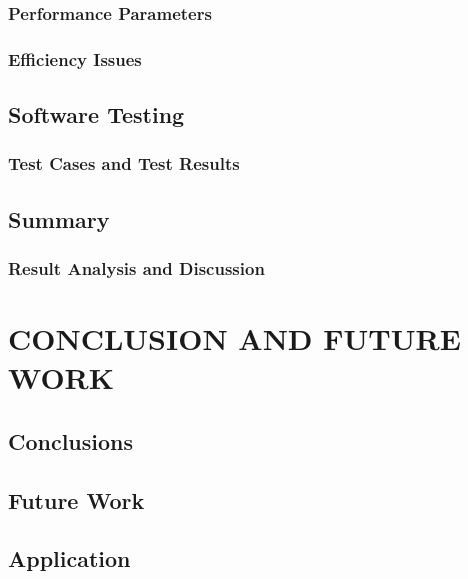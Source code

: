 \documentclass[12pt,a4]{report}
\makeatletter
\def\@makechapterhead#1{%
  \vspace*{\fill}%
  \begin{center}
    {\Huge\bfseries CHAPTER \thechapter\\[1.5ex]#1}
  \end{center}
  \thispagestyle{chaptertitle}%
  \vspace*{\fill}
  \clearpage
}
\makeatother
\begin{document}
\subsection{Performance Parameters}

\subsection{Efficiency Issues}

 \section{Software Testing}
  \subsection{Test Cases and Test Results}
 
 \section{Summary}
 \subsection{Result Analysis and Discussion}
 

 
 \chapter{CONCLUSION AND \vspace*{0.5\baselineskip} FUTURE WORK}

 \section{Conclusions}
 
 \section{Future Work}

 \section{Application}
 
\clearpage
{}
\pagestyle{empty}

\makeatletter
\renewcommand{\@chapapp}{Annexure}
\renewcommand{\thechapter}{\Alph{chapter}}
\makeatother

\makeatletter
\renewcommand{\@makechapterhead}[1]{%
  \vspace*{\fill}%
  \begin{center}
    {\Huge\bfseries Annexure \thechapter\\[1.5ex]#1}
  \end{center}
  \thispagestyle{chaptertitle}%
  \vspace*{\fill}
  \clearpage
}
\makeatother
\end{document}
